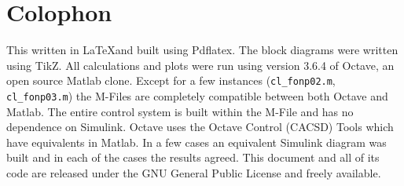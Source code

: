 \documentclass{article}
\begin{document}

\clearpage
\section{Colophon}
\label{app:colophon}

This written in \LaTeX and built using Pdflatex.
The block diagrams were written using TikZ\autocite{tikz}.
All calculations and plots were run using version 3.6.4 of
Octave\autocite{octave}, an open source Matlab clone.
Except for a few instances (\verb+cl_fonp02.m+, \verb+cl_fonp03.m+) the
M-Files are completely compatible between both Octave and Matlab.
The entire control system is built within the M-File and has
no dependence on Simulink.
Octave uses the Octave Control (CACSD) Tools\autocite{octave-control} 
which have equivalents in Matlab.
In a few cases an equivalent Simulink diagram was built and in
each of the cases the results agreed.
This document and all of its code are released under the
GNU General Public License and freely
available\autocite{github_jmahler_idle-control}.
\nocite{github_jmahler_control}


\clearpage
\printbibliography[heading=bibintoc]
\end{document}
